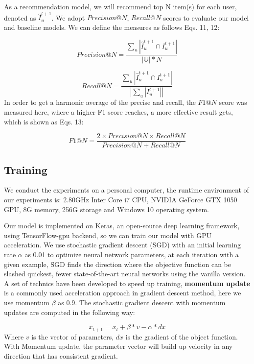 \documentclass[runningheads]{llncs}
\begin{document}
As a recommendation model, we will recommend top N item(s) for each user, denoted as $\hat{I}_{u}^{t+1}$. We adopt $Precision@N$, $Recall@N$ scores to evaluate our model and baseline models. We can define the measures as follows Eqs. 11, 12:

\begin{equation}
Precision@N=\frac{\sum_{u}|\hat{I}_{u}^{t+1}\cap I_{u}^{t+1} |}{\left | \mathbb{U} \right |*N}
\end{equation}

\begin{equation}
Recall@N=\frac{\sum_{u}|\hat{I}_{u}^{t+1}\cap I_{u}^{t+1} |}{\left |\sum_{u}|I_{u}^{t+1}| \right |}
\end{equation}
In order to get a harmonic average of the precise and recall, the $F1@N$ score was measured here, where a higher F1 score reaches, a more effective result gets, which is shown as Eqs. 13:

\begin{equation}
F1@N=\frac{2\times Precision@N\times Recall@N}{Precision@N+Recall@N}
\end{equation}
\subsection{Training}

We conduct the experiments on a personal computer, the runtime environment of our experiments is: 2.80GHz Inter Core i7 CPU, NVIDIA GeForce GTX 1050 GPU, 8G memory, 256G storage and Windows 10 operating system.

Our model is implemented on Keras, an open-source deep learning framework, using TensorFlow-gpu backend, so we can train our model with GPU acceleration. We use stochastic gradient descent (SGD) \cite{22} with an initial learning rate $\alpha$ as 0.01 to optimize neural network parameters, at each iteration with a given example, SGD finds the direction where the objective function can be slashed quickest, fewer state-of-the-art neural networks using the vanilla version. A set of technics have been developed to speed up training, \textbf{momentum update} \cite{22} is a commonly used acceleration approach in gradient descent method, here we use momentum $\beta $ as 0.9. The stochastic gradient descent with momentum updates are computed in the following way:

\begin{equation}
x_{t+1} = x_{t} + \beta \ast v -\alpha \ast dx
\end{equation}
Where $v$ is the vector of parameters, $dx$ is the gradient of the object function. With Momentum update, the parameter vector will build up velocity in any direction that has consistent gradient.
\end{document}
